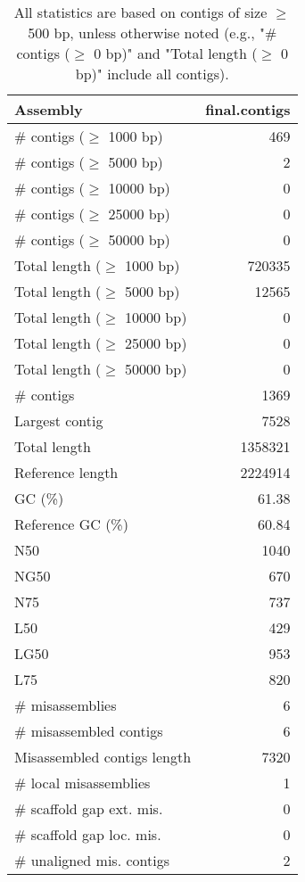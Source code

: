 \documentclass[12pt,a4paper]{article}
\begin{document}
\begin{table}[ht]
\begin{center}
\caption{All statistics are based on contigs of size $\geq$ 500 bp, unless otherwise noted (e.g., "\# contigs ($\geq$ 0 bp)" and "Total length ($\geq$ 0 bp)" include all contigs).}
\begin{tabular}{|l*{1}{|r}|}
\hline
Assembly & final.contigs \\ \hline
\# contigs ($\geq$ 1000 bp) & 469 \\ \hline
\# contigs ($\geq$ 5000 bp) & 2 \\ \hline
\# contigs ($\geq$ 10000 bp) & 0 \\ \hline
\# contigs ($\geq$ 25000 bp) & 0 \\ \hline
\# contigs ($\geq$ 50000 bp) & 0 \\ \hline
Total length ($\geq$ 1000 bp) & 720335 \\ \hline
Total length ($\geq$ 5000 bp) & 12565 \\ \hline
Total length ($\geq$ 10000 bp) & 0 \\ \hline
Total length ($\geq$ 25000 bp) & 0 \\ \hline
Total length ($\geq$ 50000 bp) & 0 \\ \hline
\# contigs & 1369 \\ \hline
Largest contig & 7528 \\ \hline
Total length & 1358321 \\ \hline
Reference length & 2224914 \\ \hline
GC (\%) & 61.38 \\ \hline
Reference GC (\%) & 60.84 \\ \hline
N50 & 1040 \\ \hline
NG50 & 670 \\ \hline
N75 & 737 \\ \hline
L50 & 429 \\ \hline
LG50 & 953 \\ \hline
L75 & 820 \\ \hline
\# misassemblies & 6 \\ \hline
\# misassembled contigs & 6 \\ \hline
Misassembled contigs length & 7320 \\ \hline
\# local misassemblies & 1 \\ \hline
\# scaffold gap ext. mis. & 0 \\ \hline
\# scaffold gap loc. mis. & 0 \\ \hline
\# unaligned mis. contigs & 2 \\ \hline

\end{tabular}
\end{center}
\end{table}
\end{document}
